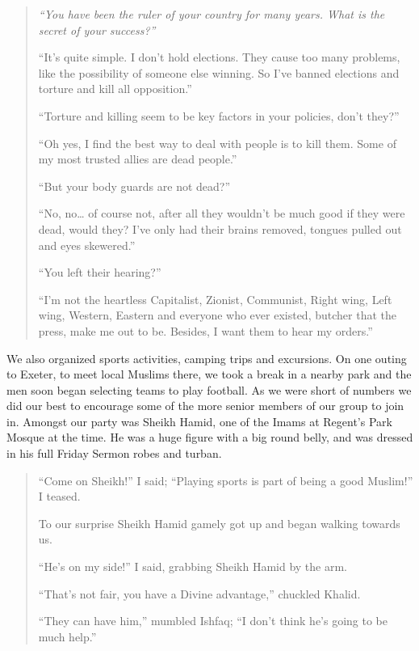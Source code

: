 \documentclass[12pt]{memoir}
\newcommand{\cor}[2]{#2} %
\begin{document}
\begin{quote}
\itshape
“You have been the ruler of your country for many years.
What is the secret of your success?”

“It’s quite simple.
I don’t hold elections.
They cause too many problems, like the possibility of someone else winning.
So I’ve banned elections and torture and kill all opposition.”

“Torture and killing seem to be key factors in your policies, don’t they?”

“Oh yes, I find the best way to deal with people is to kill them.
Some of my most trusted allies are dead people.”

“But your body guards are not dead?”

“No, no… of course not,
after all they wouldn’t be much good if they were dead, would they?
I’ve only had their brains removed, tongues pulled out and eyes skewered.”

“You left their hearing?”

“I’m not the heartless Capitalist, Zionist, Communist, Right wing,
Left wing, Western, Eastern and everyone who ever existed,
butcher that the press, make me out to be.
Besides, I want them to hear my orders.”
\end{quote}

We also organized sports activities, camping trips and excursions.
On one outing to Exeter, to meet local Muslims there,
we took a break in a nearby park
and the men soon began selecting teams to play football.
As we were short of numbers we did our best to encourage
some of the more senior members of our group to join in.
Amongst our party was Sheikh Hamid,
one of the Imams at \cor{Regents}{Regent’s} Park Mosque at the time.
He was a huge figure with a big round belly,
and was dressed in his full Friday Sermon robes and turban.

\begin{quote}
“Come on Sheikh!” I said;
“Playing sports is part of being a good Muslim!” I teased.

To our surprise Sheikh Hamid gamely got up and began walking towards us.

“He’s on my side!”
I said, grabbing Sheikh Hamid by the arm.

“That’s not fair, you have a Divine advantage,” chuckled Khalid.

“They can have him,” mumbled Ishfaq;
“I don’t think he’s going to be much help.”
\end{quote}
\end{document}
